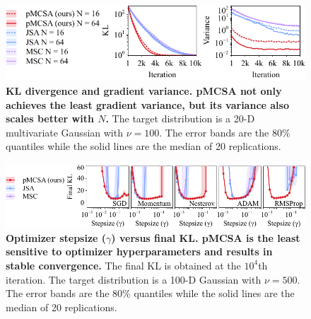 

\begin{figure}
  \vspace{-0.2in}
  \centering
  \includegraphics[scale=1.0]{figures/gaussian_02.pdf}
  \vspace{-0.07in}
  \caption{\textbf{
      KL divergence and gradient variance.
      pMCSA not only achieves the least gradient variance, but its variance also scales better with \(N\).
    }
    The target distribution is a 20-D multivariate Gaussian with \(\nu = 100\).
    The error bands are the 80\% quantiles while the solid lines are the median of 20 replications.
  }\label{fig:gaussian}
\end{figure}
\begin{figure}
  \vspace{-0.1in}
  \centering
  \includegraphics[scale=1.0]{figures/stepsize_02.pdf}
  \vspace{-0.05in}
  \caption{\textbf{Optimizer stepsize (\(\gamma\)) versus final KL.
      pMCSA is the least sensitive to optimizer hyperparameters and results in stable convergence.}
      The final KL is obtained at the \(10^4\)th iteration.
      The target distribution is a 100-D Gaussian with \(\nu = 500\).
      The error bands are the 80\% quantiles while the solid lines are the median of 20 replications.
  }\label{fig:stepsize}
\end{figure}

